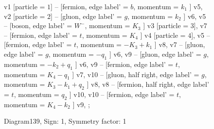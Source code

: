 \documentclass{revtex4}
\begin{document}
\begin{figure}[!htb]
\begin{center}
{    %
v1 [particle = \(1\)] -- [fermion, edge label' = \(b\), momentum = \(k_{1}\) ] v5, 
v2 [particle = \(2\)] -- [gluon, edge label' = \(g\), momentum = \(k_{2}\) ] v6, 
v5 -- [boson, edge label' = \(W^{-}\), momentum = \(K_{3}\) ] v3 [particle = \(3\)], 
v7 -- [fermion, edge label' = \(t\), momentum = \(K_{4}\) ] v4 [particle = \(4\)], 
v5 -- [fermion, edge label' = \(t\), momentum = \(-K_{3} + k_{1}\) ] v8, 
v7 -- [gluon, edge label' = \(g\), momentum = \(-q_{1}\) ] v6, 
v9 -- [gluon, edge label' = \(g\), momentum = \(-k_{2} + q_{1}\) ] v6, 
v9 -- [fermion, edge label' = \(t\), momentum = \(K_{4} - q_{1}\) ] v7, 
v10 -- [gluon, half right, edge label' = \(g\), momentum = \(K_{3} - k_{1} + q_{2}\) ] v8, 
v8 -- [fermion, half right, edge label' = \(t\), momentum = \(q_{2}\) ] v10, 
v10 -- [fermion, edge label' = \(t\), momentum = \(K_{4} - k_{2}\) ] v9, 
};
\end{center}
\caption{Diagram139, Sign: 1, Symmetry factor: 1}
\end{figure}
\newpage
\end{document}
